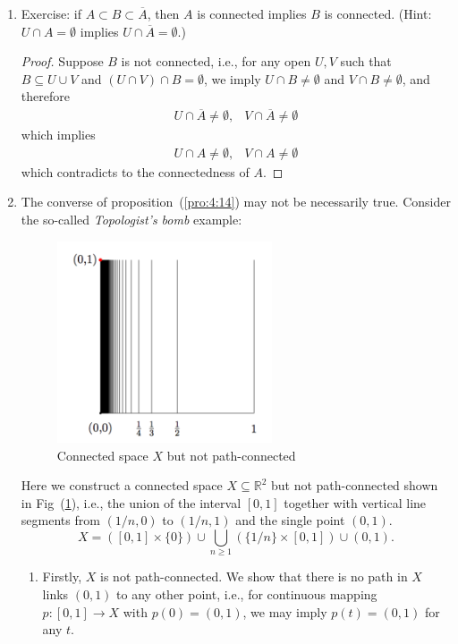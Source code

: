 \begin{example}
\begin{enumerate}
\item
Exercise: if $A\subset B\subset\overline{A}$, then ${A}$ is connected implies $B$ is connected. (Hint: $U\cap A=\emptyset$ implies $U\cap\overline{A}=\emptyset$.)
\begin{proof}
Suppose $B$ is not connected, i.e., for any open $U,V$ such that $B\subseteq U\cup V$ and $(U\cap V)\cap B = \emptyset$, we imply $U\cap B\ne\emptyset$ and $V\cap B\ne\emptyset$, and therefore
\[
\begin{array}{ll}
U\cap \overline{A}\ne\emptyset,
&
V\cap \overline{A}\ne\emptyset
\end{array}
\]
which implies
\[
\begin{array}{ll}
U\cap A\ne\emptyset,
&
V\cap A\ne\emptyset
\end{array}
\]
which contradicts to the connectedness of $A$.
\end{proof}
\item
The converse of proposition~(\ref{pro:4:14}) may not be necessarily true. Consider the so-called \emph{Topologist's bomb} example:
\begin{figure}[H]
\centering
\includegraphics[width=0.6\textwidth]{week4/p_9}
\caption{Connected space $X$ but not path-connected}
\label{fig:4:1}
\end{figure}
Here we construct a connected space $X\subseteq\mathbb{R}^2$ but not path-connected shown in Fig~(\ref{fig:4:1}), i.e., the union of the interval $[0,1]$ together with vertical line segments from $(1/n,0)$ to $(1/n,1)$ and the single point $(0,1)$.
\[
X = ([0,1]\times\{0\}) \cup \bigcup_{n\ge1}(\{1/n\}\times[0,1])\cup(0,1).
\]
\begin{enumerate}
\item
Firstly, $X$ is not path-connected. We show that there is no path in $X$ links $(0,1)$ to any other point, i.e., for continuous mapping $p:[0,1]\to X$ with $p(0)=(0,1)$, we may imply $p(t)=(0,1)$ for any $t$.


\end{enumerate}
\end{enumerate}
\end{example}
